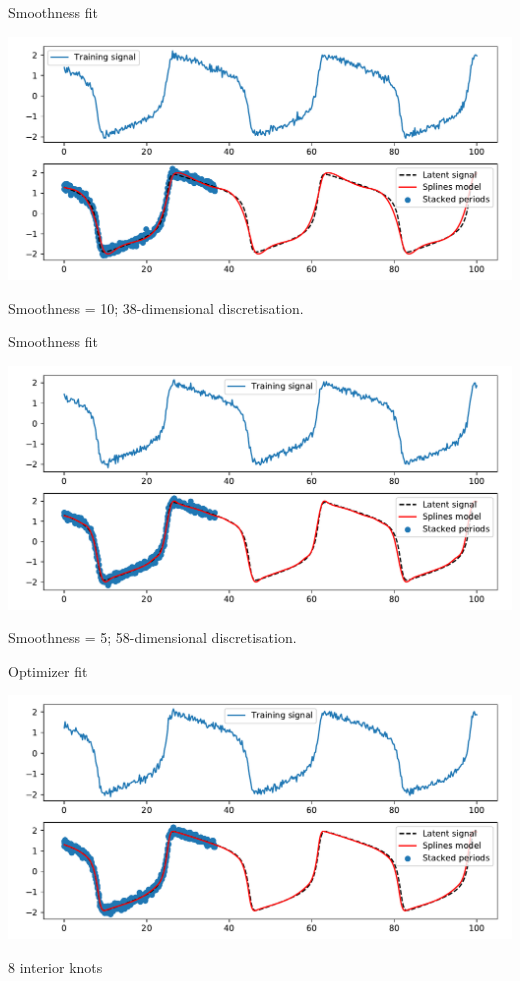 \documentclass[presentation]{beamer}
\begin{document}
\begin{frame}[label={sec:orgebe0b67}]{Smoothness fit}
   \begin{center}
\includegraphics[width=.9\linewidth]{./fit1.pdf}
\end{center}
Smoothness = 10; 38-dimensional discretisation.
\end{frame}

\begin{frame}[label={sec:org1cda50c}]{Smoothness fit}
   \begin{center}
\includegraphics[width=.9\linewidth]{./fit2.pdf}
\end{center}
Smoothness = 5; 58-dimensional discretisation.
\end{frame}

\begin{frame}[label={sec:orge871fcd}]{Optimizer fit}
   \begin{center}
\includegraphics[width=.9\linewidth]{./fit3.pdf}
\end{center}
8 interior knots
\end{frame}
\end{document}
